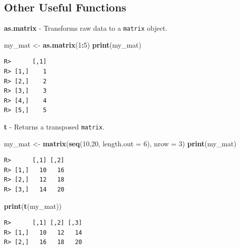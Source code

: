 \documentclass[
  12pt,
]{book}
\newenvironment{Shaded}{\begin{snugshade}}{\end{snugshade}}
\newcommand{\DataTypeTok}[1]{\textcolor[rgb]{0.27,0.27,0.27}{#1}}
\newcommand{\DecValTok}[1]{\textcolor[rgb]{0.06,0.06,0.06}{#1}}
\newcommand{\KeywordTok}[1]{\textcolor[rgb]{0.27,0.27,0.27}{\textbf{#1}}}
\newcommand{\NormalTok}[1]{#1}
\newcommand{\OperatorTok}[1]{\textcolor[rgb]{0.43,0.43,0.43}{\textbf{#1}}}
\newcommand{\StringTok}[1]{\textcolor[rgb]{0.5,0.5,0.5}{#1}}
\begin{document}
\hypertarget{other-useful-functions-1}{%
\subsection{Other Useful Functions}\label{other-useful-functions-1}}

\textbf{as.matrix} - Transforms raw data to a \texttt{matrix} object. 

\begin{Shaded}
\begin{Highlighting}[]
\NormalTok{my_mat <-}\StringTok{ }\KeywordTok{as.matrix}\NormalTok{(}\DecValTok{1}\OperatorTok{:}\DecValTok{5}\NormalTok{)}
\KeywordTok{print}\NormalTok{(my_mat)}
\end{Highlighting}
\end{Shaded}

\begin{verbatim}
R>      [,1]
R> [1,]    1
R> [2,]    2
R> [3,]    3
R> [4,]    4
R> [5,]    5
\end{verbatim}

\textbf{t} - Returns a transposed \texttt{matrix}.  

\begin{Shaded}
\begin{Highlighting}[]
\NormalTok{my_mat <-}\StringTok{ }\KeywordTok{matrix}\NormalTok{(}\KeywordTok{seq}\NormalTok{(}\DecValTok{10}\NormalTok{,}\DecValTok{20}\NormalTok{, }
                     \DataTypeTok{length.out =} \DecValTok{6}\NormalTok{), }
                 \DataTypeTok{nrow =} \DecValTok{3}\NormalTok{)}
\KeywordTok{print}\NormalTok{(my_mat)}
\end{Highlighting}
\end{Shaded}

\begin{verbatim}
R>      [,1] [,2]
R> [1,]   10   16
R> [2,]   12   18
R> [3,]   14   20
\end{verbatim}

\begin{Shaded}
\begin{Highlighting}[]
\KeywordTok{print}\NormalTok{(}\KeywordTok{t}\NormalTok{(my_mat))}
\end{Highlighting}
\end{Shaded}

\begin{verbatim}
R>      [,1] [,2] [,3]
R> [1,]   10   12   14
R> [2,]   16   18   20
\end{verbatim}
\end{document}
